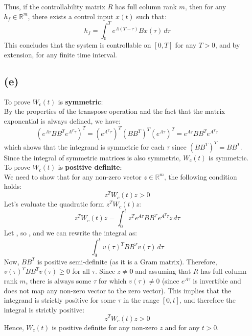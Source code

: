 \documentclass[12pt]{article}
\begin{document}
Thus, if the controllability matrix $R$ has full column rank $m$, then for any $h_f \in \mathbb{R}^m$, there exists a control input $x(t)$ such that:
\[
h_f = \int_{0}^{T} e^{A(T-\tau)} Bx(\tau) \, d\tau
\]
This concludes that the system is controllable on $[0,T]$ for any $T>0$, and by extension, for any finite time interval.

\subsection*{(e)}
To prove $W_c(t)$ is \textbf{symmetric}:\\
By the properties of the transpose operation and the fact that the matrix exponential is always defined, we have:
\[
\left( e^{A\tau} BB^T e^{A^T\tau} \right)^T = \left( e^{A^T\tau} \right)^T (BB^T)^T \left( e^{A\tau} \right)^T = e^{A\tau} BB^T e^{A^T\tau}
\]
which shows that the integrand is symmetric for each $\tau$ since $(BB^T)^T=BB^T$. Since the integral of symmetric matrices is also symmetric, $W_c(t)$ is symmetric.\\

To prove $W_c(t)$ is \textbf{positive definite}:\\
We need to show that for any non-zero vector $z \in \mathbb{R}^m$, the following condition holds:
\[
z^TW_c(t)z>0
\]
Let's evaluate the quadratic form $z^TW_c(t)z$:
\[
z^T W_c(t) z = \int_{0}^{t} z^T e^{A\tau} BB^T e^{A^T\tau} z \, d\tau
\]
Let $ $, so $ $, and we can rewrite the integral as:
\[
\int_{0}^{t} v(\tau)^T BB^T v(\tau) \, d\tau
\]
Now, $BB^T$ is positive semi-definite (as it is a Gram matrix). Therefore, $v(\tau)^TBB^Tv(\tau)\geq 0$ for all $\tau$. Since $z \neq 0$ and assuming that $R$ has full column rank $m$, there is always some $\tau$ for which $v(\tau)\neq 0$ (since $e^{A\tau}$ is invertible and does not map any non-zero vector to the zero vector). This implies that the integrand is strictly positive for some $\tau$ in the range $[0,t]$, and therefore the integral is strictly positive:
\[
z^TW_c(t)z>0
\]
Hence, $W_c(t)$ is positive definite for any non-zero $z$ and for any $t>0$.
\end{document}
